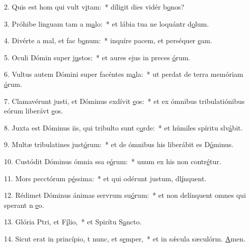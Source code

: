 2. Quis est hom qui vult v\uline{i}tam:~* díligit dies vidér b\uline{o}nos?\par 
3. Próhibe linguam tam a m\uline{a}lo:~* et lábia tua ne loquántr d\uline{o}lum.\par 
4. Divérte a mal, et fac b\uline{o}num:~* inquíre pacem, et perséquer \uline{e}am.\par 
5. Oculi Dómin super j\uline{u}stos:~* et aures ejus in preces \uline{ó}rum.\par 
6. Vultus autem Dómini super facéntes m\uline{a}la:~* ut perdat de terra memóriam \uline{ó}rum.\par 
7. Clamavérunt justi, et Dóminus exdívit \uline{e}os:~* et ex ómnibus tribulatiónibus eórum liberávt \uline{e}os.\par 
8. Juxta est Dóminus iis, qui tribulto sunt c\uline{o}rde:~* et húmiles spíritu slv\uline{á}bit.\par 
9. Multæ tribulatines just\uline{ó}rum:~* et de ómnibus his liberábit es D\uline{ó}minus.\par 
10. Custódit Dóminus ómnia ssa e\uline{ó}rum:~* unum ex his non contr\uline{é}tur.\par 
11. Mors pecctórum p\uline{é}ssima:~* et qui odérunt justum, dl\uline{í}nquent.\par 
12. Rédimet Dóminus ánimas servrum su\uline{ó}rum:~* et non delínquent omnes qui sperant n \uline{e}o.\par 
13. Glória Ptri, et F\uline{í}lio,~* et Spirítu S\uline{a}ncto.\par 
14. Sicut erat in princípio, t nunc, et s\uline{e}mper,~* et in sǽcula sæculórm. \uline{A}men.\par 
